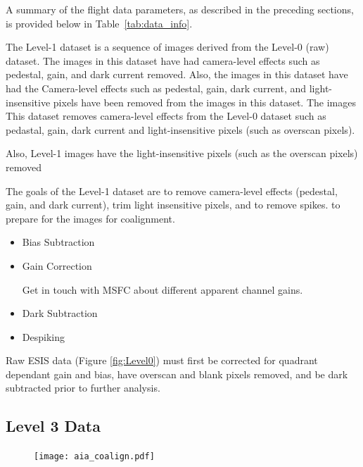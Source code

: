     	
    	A summary of the flight data parameters, as described in the preceding sections, is provided below in Table~\ref{tab:data_info}. 
    	
    
        The Level-1 dataset is a sequence of images derived from the Level-0 (raw) dataset.
        The images in this dataset have had camera-level effects such as pedestal, gain, and dark current removed.
        Also, the images in this dataset have had the 
        Camera-level effects such as pedestal, gain, dark current, and light-insensitive pixels have been removed from the images in this dataset.
        The images 
        This dataset removes camera-level effects from the Level-0 dataset such as pedastal, gain, dark current and light-insensitive pixels (such as overscan pixels).
        
        
        Also, Level-1 images have the light-insensitive pixels (such as the overscan pixels) removed 
    
        The goals of the Level-1 dataset are to remove camera-level effects (pedestal, gain, and dark current), trim light insensitive pixels, and to remove spikes. to prepare for the images for coalignment.
    
        \begin{itemize}
            \item Bias Subtraction
            \item Gain Correction
         
            
                 Get in touch with MSFC about different apparent channel gains.
            \item Dark Subtraction
            \item Despiking
        \end{itemize}
       Raw ESIS data (Figure \ref{fig:Level0}) must first be corrected for quadrant dependant gain and bias, have overscan and blank pixels removed, and be dark subtracted prior to further analysis.
       
	       


    \subsection{Level 3 Data}

    	
        \newcommand{\levthreetime}{2019-09-30T18:08:51.644}
        \begin{figure}
            \centering
            \texttt{[image: aia\_coalign.pdf]}
            \caption{}
            \label{fig:coalign}
        \end{figure}
        
